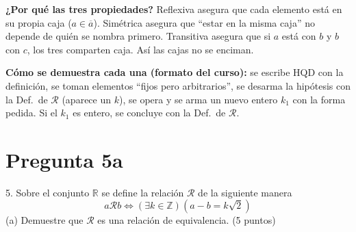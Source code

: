 \documentclass[11pt]{article}
\begin{document}
\textbf{¿Por qué las tres propiedades?} Reflexiva asegura que cada elemento está en su propia caja ($a\in\overline a$). Simétrica asegura que ``estar en la misma caja'' no depende de quién se nombra primero. Transitiva asegura que si $a$ está con $b$ y $b$ con $c$, los tres comparten caja. Así las cajas no se enciman.

\textbf{Cómo se demuestra cada una (formato del curso):} se escribe HQD con la definición, se toman elementos ``fijos pero arbitrarios'', se desarma la hipótesis con la Def.~de $\mathcal R$ (aparece un $k$), se opera y se arma un nuevo entero $k_1$ con la forma pedida. Si el $k_1$ es entero, se concluye con la Def.~de $\mathcal R$.

\clearpage
\section*{Pregunta 5a}

5. Sobre el conjunto $\mathbb R$ se define la relación $\mathcal R$ de la siguiente manera
\[
a\mathcal Rb\Leftrightarrow(\exists k\in\mathbb Z)\left(a-b=k\sqrt2\right)
\]
(a) Demuestre que $\mathcal R$ es una \colorbox{green!35}{relación de equivalencia.} \hfill (5 puntos)

\begin{center}
\end{center}

\end{document}
